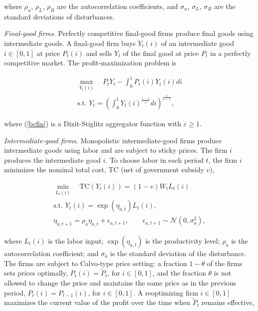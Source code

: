 where $\rho _{u}$, $\rho _{L}$, $\rho _{B}$ are the autocorrelation
coefficients, and $\sigma _{u}$, $\sigma _{L}$, $\sigma _{B}$ are the standard
deviations of disturbances.

\textit{Final-good firms. }Perfectly competitive final-good firms produce final
goods using intermediate goods. A final-good firm buys $Y_{t}\left( i\right) $
of an intermediate good $i\in \left[ 0,1\right] $ at price $P_{t}\left(
i\right) $ and sells $Y_{t}$ of the final good at price $P_{t}$ in a perfectly
competitive market. The profit-maximization problem is

\begin{gather}
\underset{Y_{t}\left( i\right) }{\max }\quad
P_{t}Y_{t}-\int_{0}^{1}P_{t}\left( i\right) Y_{t}\left( i\right) di
\label{maxfin} \\
\text{s.t. }Y_{t}=\left( \int_{0}^{1}Y_{t}\left( i\right) ^{\frac{
\varepsilon -1}{\varepsilon }}di\right) ^{\frac{\varepsilon }{\varepsilon -1}
},  \label{bcfin}
\end{gather}

where (\ref{bcfin}) is a Dixit-Stiglitz aggregator function with $\varepsilon
\geq 1$.

\textit{Intermediate-good firms. }Monopolistic intermediate-good firms produce
intermediate goods using labor and are subject to sticky prices. The firm $i$
produces the intermediate good $i$. To choose labor in each period $ t$, the
firm $i$ minimizes the nominal total cost, TC (net of government subsidy $v$),

\begin{gather}
\underset{L_{t}\left( i\right) }{\min }\quad \text{TC}\left( Y_{t}\left(
i\right) \right) =\left( 1-v\right) W_{t}L_{t}\left( i\right)  \label{tc} \\
\text{s.t. }Y_{t}\left( i\right) =\exp \left( \eta _{a,t}\right) L_{t}\left(
i\right) ,  \label{tech} \\
\eta _{a,t+1}=\rho _{a}\eta _{a,t}+\epsilon _{a,t+1},\qquad \epsilon
_{a,t+1}\sim \mathcal{N}\left( 0,\sigma _{a}^{2}\right) ,  \label{nua}
\end{gather}

where $L_{t}\left( i\right) $ is the labor input; $\exp \left( \eta
_{a,t}\right) $ is the productivity level; $\rho _{a}$ is the autocorrelation
coefficient; and $\sigma _{a}$ is the standard deviation of the disturbance.
The firms are subject to Calvo-type price setting: a fraction $1-\theta $ of
the firms sets prices optimally, $P_{t}\left( i\right) =\widetilde{P}_{t}$, for
$i\in \left[ 0,1\right] $, and the fraction $\theta $ is not allowed to change
the price and maintains the same price as in the previous period, $P_{t}\left(
i\right) =P_{t-1}\left( i\right) $, for $i\in \left[ 0,1\right] $. A
reoptimizing firm $i\in \left[ 0,1\right] $ maximizes the current value of the
profit over the time when $ \widetilde{P}_{t}$ remains effective,

